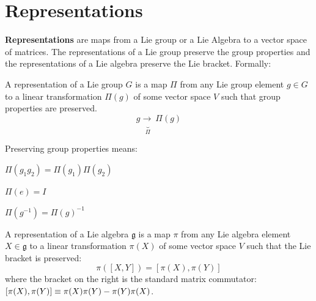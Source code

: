 

\chapter{Representations}

\noindent \textbf{Representations} are maps from a Lie group or a Lie Algebra 
to a vector space of matrices. The representations of a Lie group preserve the 
group properties and the representations of a Lie algebra preserve the Lie 
bracket. Formally:

\begin{definition}
    A representation of a Lie group $G$ is a map $\Pi$ from any Lie group element
    $g\in{G}$ to a linear transformation $\Pi(g)$ of some vector space $V$ such
    that group properties are preserved.
\begin{equation}
    g \underbrace{\longrightarrow~}_{\Pi} \Pi(g) \tag{Sch:3.65}
\end{equation}
\end{definition}

\begin{remark}
\noindent Preserving group properties means:
\begin{description}[noitemsep]
    \item[Multiplication is preserved:] $\Pi(g_1 g_2) = \Pi(g_1) \Pi(g_2)$ 
    \item[Group identity maps to matrix identity:] $\Pi(e) = I$
    \item[Inverses are preserved:] $\Pi(g^{-1}) = \Pi(g)^{-1}$
\end{description}
\end{remark}

\begin{definition}
    A representation of a Lie algebra $\mathfrak{g}$ is a map $\pi$ from any 
    Lie algebra element $X \in \mathfrak{g}$ to a linear transformation 
    $\pi(X)$ of some vector space $V$ such that the Lie bracket is preserved:
    \begin{equation}
        \pi([X, Y]) = [\pi(X), \pi(Y)] %
    \end{equation}
    where the bracket on the right is the standard matrix commutator: $[\pi(X), \pi(Y)] \mathrel{\equiv} \pi(X)\pi(Y) -
  \pi(Y)\pi(X)$.
\end{definition}

